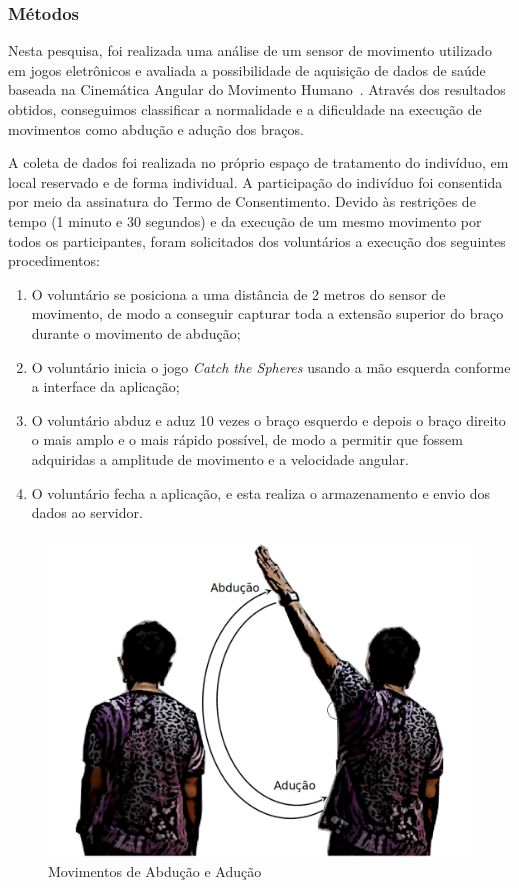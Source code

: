 \subsubsection{Métodos}
Nesta pesquisa, foi realizada uma análise de um sensor de movimento utilizado em jogos eletrônicos e avaliada a possibilidade de aquisição de dados de saúde baseada na Cinemática Angular do Movimento Humano~\cite{hamill1999bases}.  Através dos resultados obtidos, conseguimos classificar a normalidade e a dificuldade na execução de movimentos como abdução e adução dos braços.

A coleta de dados foi realizada no próprio espaço de tratamento do indivíduo, em local reservado e de forma individual. A participação do indivíduo foi consentida por meio da assinatura do Termo de Consentimento. Devido às restrições de tempo (1 minuto e 30 segundos) e da execução de um mesmo movimento por todos os participantes, foram solicitados dos voluntários a execução dos seguintes procedimentos:
\begin{enumerate}
	\item O voluntário se posiciona a uma distância de 2 metros do sensor de movimento, de modo a conseguir capturar toda a extensão superior do braço durante o movimento de abdução; 	
	\item O voluntário inicia o jogo \textit{Catch the Spheres} usando a mão esquerda conforme a interface da aplicação;
	\item O voluntário abduz e aduz 10 vezes o braço esquerdo e depois o braço direito o mais amplo e o mais rápido possível, de modo a permitir que fossem adquiridas a amplitude de movimento e a velocidade angular. 
	\item O voluntário fecha a aplicação, e esta realiza o armazenamento e envio dos dados ao servidor.
\end{enumerate}

\begin{figure}[!htbp]
 \centering
 \includegraphics[scale=0.25]{./img/movaddcutctionartist2.png}
\caption{Movimentos de Abdução e Adução}
 \label{fig:movabducaomet}
\end{figure}

